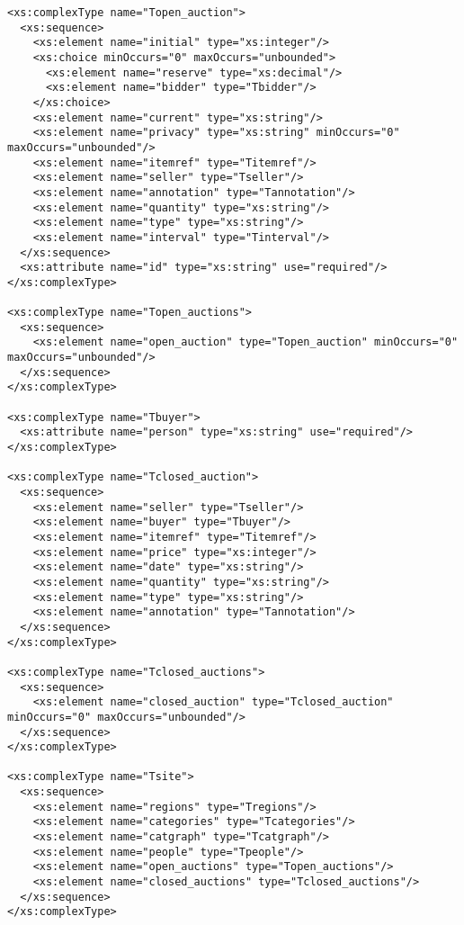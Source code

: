 \begin{lstlisting}[caption=Resulting XSD of Test Scenario B, frame=single, label=listing_xsd]
<xs:complexType name="Topen_auction">
  <xs:sequence>
    <xs:element name="initial" type="xs:integer"/>
    <xs:choice minOccurs="0" maxOccurs="unbounded">
      <xs:element name="reserve" type="xs:decimal"/>
      <xs:element name="bidder" type="Tbidder"/>
    </xs:choice>
    <xs:element name="current" type="xs:string"/>
    <xs:element name="privacy" type="xs:string" minOccurs="0" maxOccurs="unbounded"/>
    <xs:element name="itemref" type="Titemref"/>
    <xs:element name="seller" type="Tseller"/>
    <xs:element name="annotation" type="Tannotation"/>
    <xs:element name="quantity" type="xs:string"/>
    <xs:element name="type" type="xs:string"/>
    <xs:element name="interval" type="Tinterval"/>
  </xs:sequence>
  <xs:attribute name="id" type="xs:string" use="required"/>
</xs:complexType>

<xs:complexType name="Topen_auctions">
  <xs:sequence>
    <xs:element name="open_auction" type="Topen_auction" minOccurs="0" maxOccurs="unbounded"/>
  </xs:sequence>
</xs:complexType>

<xs:complexType name="Tbuyer">
  <xs:attribute name="person" type="xs:string" use="required"/>
</xs:complexType>

<xs:complexType name="Tclosed_auction">
  <xs:sequence>
    <xs:element name="seller" type="Tseller"/>
    <xs:element name="buyer" type="Tbuyer"/>
    <xs:element name="itemref" type="Titemref"/>
    <xs:element name="price" type="xs:integer"/>
    <xs:element name="date" type="xs:string"/>
    <xs:element name="quantity" type="xs:string"/>
    <xs:element name="type" type="xs:string"/>
    <xs:element name="annotation" type="Tannotation"/>
  </xs:sequence>
</xs:complexType>

<xs:complexType name="Tclosed_auctions">
  <xs:sequence>
    <xs:element name="closed_auction" type="Tclosed_auction" minOccurs="0" maxOccurs="unbounded"/>
  </xs:sequence>
</xs:complexType>

<xs:complexType name="Tsite">
  <xs:sequence>
    <xs:element name="regions" type="Tregions"/>
    <xs:element name="categories" type="Tcategories"/>
    <xs:element name="catgraph" type="Tcatgraph"/>
    <xs:element name="people" type="Tpeople"/>
    <xs:element name="open_auctions" type="Topen_auctions"/>
    <xs:element name="closed_auctions" type="Tclosed_auctions"/>
  </xs:sequence>
</xs:complexType>


\end{lstlisting}
